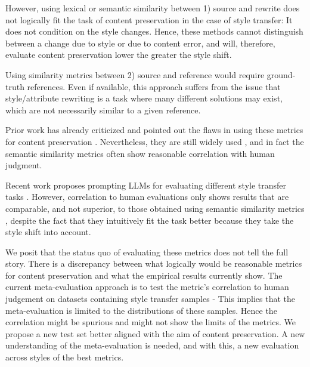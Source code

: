 However, using lexical or semantic similarity between 1) source and rewrite does not logically fit the task of content preservation in the case of style transfer: It does not condition on the style changes. Hence, these methods cannot distinguish between a change due to style or due to content error, and will, therefore, evaluate content preservation lower the greater the style shift. 

Using similarity metrics between 2) source and reference would require ground-truth references. Even if available, this approach suffers from the issue that style/attribute rewriting is a task where many different solutions may exist, which are not necessarily similar to a given reference.  

Prior work has already criticized and pointed out the flaws in using these metrics for content preservation \citep{lai-etal-2024-style,scialom2021rethinking,mir-etal-2019-evaluating,logacheva-etal-2022-study}. Nevertheless, they are still widely used \citep{lai-etal-2024-style,hallinan-etal-2023-steer,han-etal-2024-disentangled,mukherjee-etal-2024-large-language,liu2024adaptive,zhang-etal-2024-distilling,luo-etal-2023-prompt,zeng2024bat}, and in fact the semantic similarity metrics often show reasonable correlation with human judgment.

Recent work proposes prompting LLMs for evaluating different style transfer tasks \citep{ zeng2024bat,lai2023multidimensional,ostheimer-etal-2024-text}. However, correlation to human evaluations only shows results that are comparable, and not superior, to those obtained using semantic similarity metrics \citep{lai2023multidimensional, ostheimer-etal-2024-text}, despite the fact that they intuitively fit the task better because they take the style shift into account.

We posit that the status quo of evaluating these metrics does not tell the full story. There is a discrepancy between what logically would be reasonable metrics for content preservation and what the empirical results currently show. The current meta-evaluation approach is to test the metric's correlation to human judgement on datasets containing style transfer samples  - This implies that the meta-evaluation is limited to the distributions of these samples. Hence the correlation might be spurious and might not show the limits of the metrics. We propose a new test set better aligned with the aim of content preservation. A new understanding of the meta-evaluation is needed, and with this, a new evaluation across styles of the best metrics.   

